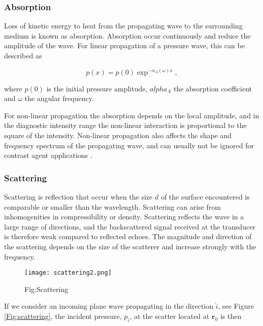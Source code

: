 \subsubsection{Absorption}
Loss of kinetic energy to heat from the propagating wave to the surrounding medium is known as absorption. Absorption occur continuously and reduce the amplitude of the wave. For linear propagation of a pressure wave, this can be described as 

\begin{equation}
p(x) = p(0)\exp^{-\alpha_A(\omega)x},
\end{equation} 

where $p(0)$ is the initial pressure amplitude, $alpha_A$ the absorption coefficient and $\omega$ the angular frequency.

For non-linear propagation the absorption depends on the local amplitude, and in the diagnostic intensity range the non-linear interaction is proportional to the square of the intensity\cite{:/content/asa/journal/jasa/97/3/10.1121/1.412091}. Non-linear propagation also affects the shape and frequency spectrum of the propagating wave, and can usually not be ignored for contrast agent applications \cite{Healey2012}. 

 
\subsubsection{Scattering}
Scattering is reflection that occur when the size $d$ of the surface encountered is comparable or smaller than the wavelength. Scattering can arise from inhomogenities in compressibility or density. Scattering reflects the wave in a large range of directions, and the backscattered signal received at the transducer is therefore weak compared to reflected echoes. The magnitude and direction of the scattering depends on the size of the scatterer and increase strongly with the frequency.  

\begin{figure}[h]
  \centering
  \texttt{[image: scattering2.png]}
  \caption{Fig:Scattering}
\end{figure}
If we consider an incoming plane wave propagating in the direction $\hat{i}$, see Figure \ref{Fig:scattering}, the incident pressure, $p_i$, at the scatter located at $\textbf{r}_0$ is then

